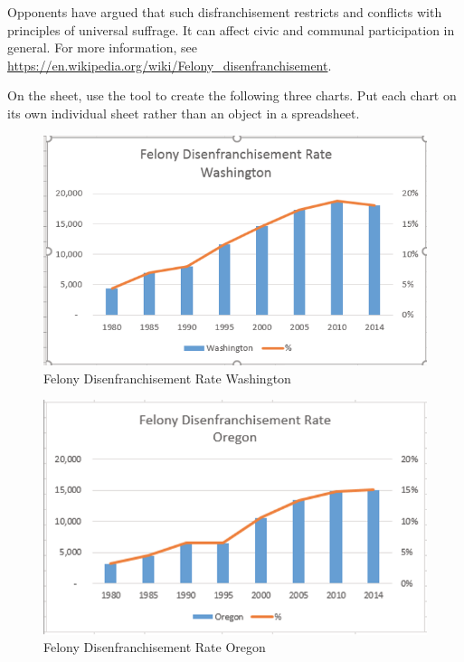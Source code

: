 Opponents have argued that such disfranchisement restricts and conflicts with principles of universal suffrage. It can affect civic and communal participation in general. For more information, see \url{https://en.wikipedia.org/wiki/Felony_disenfranchisement}.

On the  sheet, use the  tool to create the following three charts. Put each chart on its own individual sheet rather than an object in a spreadsheet.


\begin{figure}[H]
	\centering
	\includegraphics[width=\maxwidth{.95\linewidth}]{gfx/ch04_fig54}
	\caption{Felony Disenfranchisement Rate Washington}
	\label{04:fig54}
\end{figure}


\begin{figure}[H]
	\centering
	\includegraphics[width=\maxwidth{.95\linewidth}]{gfx/ch04_fig55}
	\caption{Felony Disenfranchisement Rate Oregon}
	\label{04:fig55}
\end{figure}

